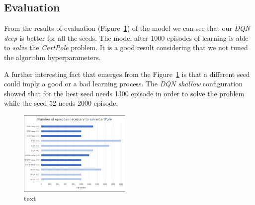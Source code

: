 \subsection{Evaluation}

From the results of evaluation (Figure~\ref{fig:comparison}) of the model we can see that our \textit{DQN deep} is better for all the seeds. The model after 1000 episodes of learning is able to \textit{solve} the \textit{CartPole} problem. It is a good result considering that we not tuned the algorithm hyperparameters.

A further interesting fact that emerges from the Figure~\ref{fig:comparison} is that a different seed could imply a good or a bad learning process. The \textit{DQN shallow} configuration showed that for the best seed needs 1300 episode in order to solve the problem while the seed 52 needs 2000 episode.

\begin{figure}
	\centering
	\includegraphics[width=0.48\textwidth]{res/Comparison}
	\caption{text}
	\label{fig:comparison}
\end{figure}
